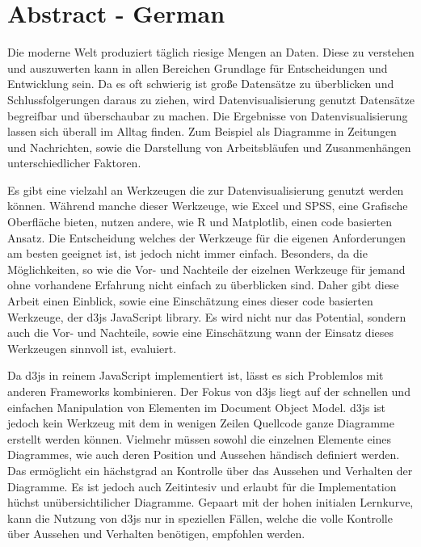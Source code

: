 \chapter*{Abstract - German} %

Die moderne Welt produziert täglich riesige Mengen an Daten. Diese zu verstehen und auszuwerten kann in allen Bereichen Grundlage für Entscheidungen und Entwicklung sein. Da es oft schwierig ist große Datensätze zu überblicken und Schlussfolgerungen daraus zu ziehen, wird Datenvisualisierung genutzt Datensätze begreifbar  und überschaubar zu machen. Die Ergebnisse von Datenvisualisierung lassen sich überall im Alltag finden. Zum Beispiel als Diagramme in Zeitungen und Nachrichten, sowie die Darstellung von Arbeitsbläufen und Zusanmenhängen unterschiedlicher Faktoren.

Es gibt eine vielzahl an Werkzeugen die zur Datenvisualisierung genutzt werden können. Während manche dieser Werkzeuge, wie Excel und SPSS, eine Grafische Oberfläche bieten, nutzen andere, wie R und Matplotlib, einen code basierten Ansatz. Die Entscheidung welches der Werkzeuge für die eigenen Anforderungen am besten geeignet ist, ist jedoch nicht immer einfach. Besonders, da die Möglichkeiten, so wie die Vor- und Nachteile der eizelnen Werkzeuge für jemand ohne vorhandene Erfahrung nicht einfach zu überblicken sind. Daher gibt diese Arbeit einen Einblick, sowie eine Einschätzung eines dieser code basierten Werkzeuge, der d3js JavaScript library. Es wird nicht nur das Potential, sondern auch die Vor- und Nachteile, sowie eine Einschätzung wann der Einsatz dieses Werkzeugen sinnvoll ist, evaluiert.

Da d3js in reinem JavaScript implementiert ist, lässt es sich Problemlos mit anderen Frameworks kombinieren. Der Fokus von d3js liegt auf der schnellen und einfachen Manipulation von Elementen im Document Object Model. d3js ist jedoch kein Werkzeug mit dem in wenigen Zeilen Quellcode ganze Diagramme erstellt werden können. Vielmehr müssen sowohl die einzelnen Elemente eines Diagrammes, wie auch deren Position und Aussehen händisch definiert werden. Das ermöglicht ein hächstgrad an Kontrolle über das Aussehen und Verhalten der Diagramme. Es ist jedoch auch Zeitintesiv und erlaubt für die Implementation hüchst unübersichtilicher Diagramme. Gepaart mit der hohen initialen Lernkurve, kann die Nutzung von d3js nur in speziellen Fällen, welche die volle Kontrolle über Aussehen und Verhalten benötigen, empfohlen werden.